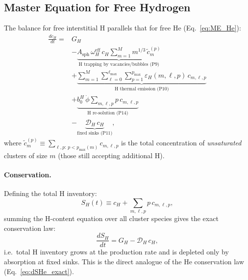 \subsection{Master Equation for Free Hydrogen}
\label{sec:ME_H}

The balance for free interstitial H parallels that for free He
(Eq.~\ref{eq:ME_He}):
\begin{equation}\label{eq:ME_H}
\boxed{
\begin{split}
\frac{dc_H}{dt} = {} &
    G_H
    \\
    &- \underbrace{
       A_{\mathrm{sph}}\,\omega_H^{\mathrm{eff}}\,c_H
       \sum_{m=1}^{M} m^{1/3}\,\tilde{c}_m^{(p)}
       }_{\text{H trapping by vacancies/bubbles (P9)}}
    \\
    &+ \underbrace{
       \sum_{m=1}^{M}\sum_{\ell=0}^{\ell_{\max}}\sum_{p=1}^{p_{\max}}
       \varepsilon_H(m,\ell,p)\,c_{m,\ell,p}
       }_{\text{H thermal emission (P10)}}
    \\
    &+ \underbrace{
       b_0^H\,\dot{\phi}\sum_{m,\ell,p} p\,c_{m,\ell,p}
       }_{\text{H re-solution (P14)}}
    \\
    &- \underbrace{
       \mathcal{D}_H\,c_H
       }_{\text{fixed sinks (P11)}},
\end{split}
}
\end{equation}
where $\tilde{c}_m^{(p)} \equiv \sum_{\ell,p:\,p < p_{\max}(m)} c_{m,\ell,p}$
is the total concentration of \emph{unsaturated} clusters of size $m$
(those still accepting additional H).

\paragraph{Conservation.}
Defining the total H inventory:
\begin{equation}\label{eq:SH}
    S_H(t) \equiv c_H + \sum_{m,\ell,p} p\,c_{m,\ell,p},
\end{equation}
summing the H-content equation over all cluster species gives the exact
conservation law:
\begin{equation}\label{eq:dSH}
    \frac{dS_H}{dt} = G_H - \mathcal{D}_H\,c_H,
\end{equation}
i.e.\ total H inventory grows at the production rate and is depleted
only by absorption at fixed sinks.  This is the direct analogue of the
He conservation law (Eq.~\ref{eq:dSHe_exact}).

